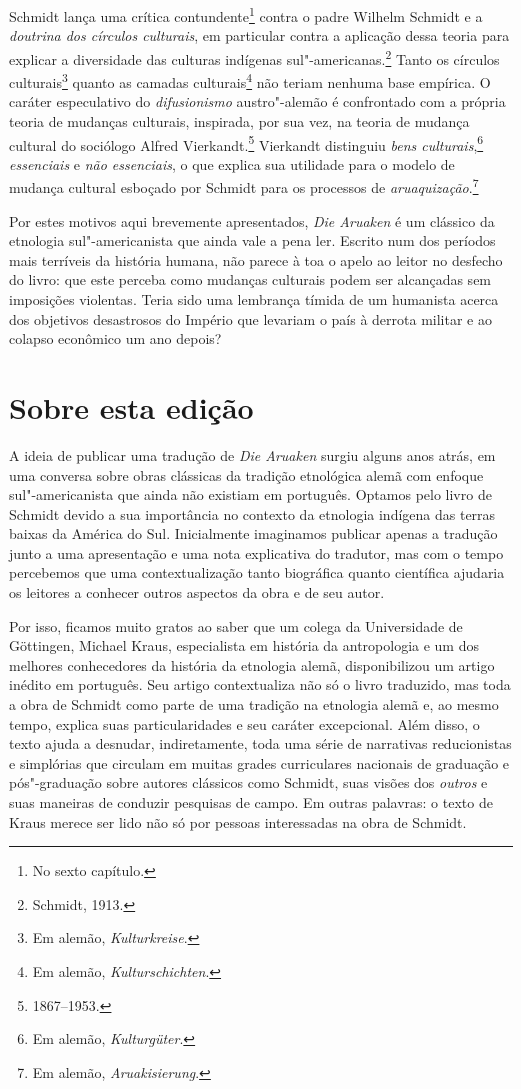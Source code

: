 Schmidt lança uma crítica contundente\footnote{No sexto capítulo.} contra o padre Wilhelm
Schmidt e a \textit{doutrina dos círculos culturais}, em particular contra a
aplicação dessa teoria para explicar a diversidade das culturas
indígenas sul"-americanas.\footnote{Schmidt, 1913.} Tanto os círculos culturais\footnote{Em alemão, \textit{Kulturkreise}.} quanto as camadas culturais\footnote{Em alemão, \textit{Kulturschichten}.} não teriam nenhuma base empírica. O caráter
especulativo do \textit{difusionismo} austro"-alemão é confrontado com a própria
teoria de mudanças culturais, inspirada, por sua vez, na teoria de
mudança cultural do sociólogo Alfred Vierkandt.\footnote{1867--1953.} Vierkandt distinguiu \textit{bens culturais},\footnote{Em alemão, \textit{Kulturgüter}.} \textit{essenciais} e \textit{não essenciais}, o que explica
sua utilidade para o modelo de mudança cultural esboçado por Schmidt
para os processos de \textit{aruaquização}.\footnote{Em alemão, \textit{Aruakisierung}.}

Por estes motivos aqui brevemente apresentados, \textit{Die Aruaken} é um clássico da 
etnologia sul"-americanista que ainda
vale a pena ler. Escrito num dos períodos mais terríveis da história
humana, não parece à toa o apelo ao leitor no desfecho do livro: que este perceba como 
mudanças culturais podem ser alcançadas sem
imposições violentas. Teria sido uma lembrança tímida de um humanista
acerca dos objetivos desastrosos do Império que levariam o país à derrota
militar e ao colapso econômico um ano depois?

\section{Sobre esta edição}

A ideia de publicar uma tradução de \textit{Die Aruaken} surgiu alguns
anos atrás, em uma conversa sobre obras clássicas da tradição etnológica alemã com enfoque sul"-americanista que ainda não existiam em português. Optamos pelo livro
de Schmidt devido a sua importância no contexto da etnologia
indígena das terras baixas da América do Sul. Inicialmente imaginamos
publicar apenas a tradução junto a uma apresentação e uma nota
explicativa do tradutor, mas com o tempo percebemos que uma
contextualização tanto biográfica quanto científica ajudaria os leitores
a conhecer outros aspectos da obra e de seu autor.

Por isso, ficamos muito gratos ao saber que um colega da Universidade de Göttingen, Michael Kraus, especialista em história da antropologia e um dos melhores conhecedores da história da etnologia alemã, disponibilizou um artigo inédito em português. Seu artigo contextualiza não só o livro traduzido, mas toda a obra de Schmidt como parte de uma tradição na etnologia alemã e, ao mesmo tempo, explica suas particularidades e seu caráter excepcional. Além disso, o texto ajuda a desnudar, indiretamente, toda uma série de narrativas reducionistas e simplórias que circulam em muitas grades curriculares nacionais de graduação e pós"-graduação sobre autores clássicos como Schmidt, suas visões dos \textit{outros} e suas maneiras de conduzir pesquisas de campo. Em outras palavras: o texto de Kraus merece ser lido não só por pessoas interessadas na obra de Schmidt.

